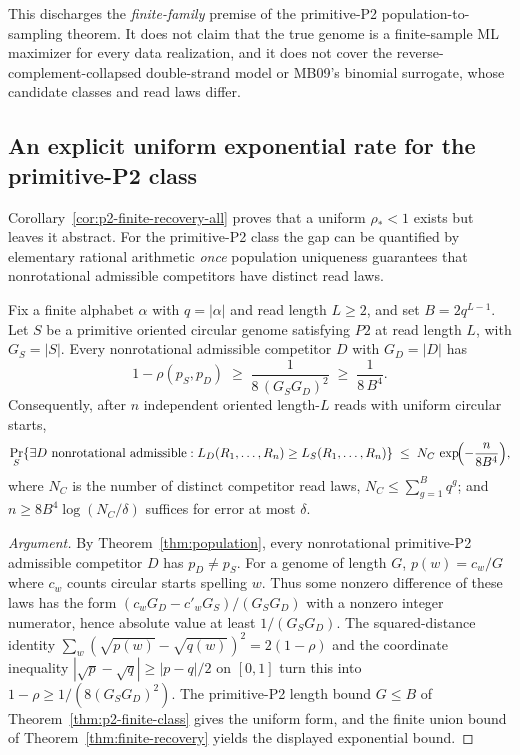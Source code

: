 This discharges the \emph{finite-family} premise of the primitive-P2
population-to-sampling theorem.  It does not claim that the true genome is a
finite-sample ML maximizer for every data realization, and it does not cover
the reverse-complement-collapsed double-strand model or MB09's binomial
surrogate, whose candidate classes and read laws differ.


\subsection{An explicit uniform exponential rate for the primitive-P2 class}
\label{sec:p2-uniform-rate}

Corollary~\ref{cor:p2-finite-recovery-all} proves that a uniform
$\rho_*<1$ exists but leaves it abstract.  For the primitive-P2 class the gap
can be quantified by elementary rational arithmetic \emph{once}
population uniqueness guarantees that nonrotational admissible
competitors have distinct read laws.

\begin{theorem}
\label{thm:p2-uniform-rate}
Fix a finite alphabet $\alpha$ with $q=|\alpha|$ and read length $L\ge2$, and
set $B=2q^{L-1}$.  Let $S$ be a primitive oriented circular genome satisfying
$P2$ at read length $L$, with $G_S=|S|$.  Every nonrotational admissible
competitor $D$ with $G_D=|D|$ has
\[
  1-\rho(p_S,p_D)\;\ge\;\frac{1}{8\,(G_S G_D)^2}\;\ge\;\frac{1}{8\,B^4}.
\]
Consequently, after $n$ independent oriented length-$L$ reads with uniform
circular starts,
\[
  \Pr_S\!\left\{\exists D\ \text{nonrotational admissible}:
       L_D(R_1,\dots,R_n)\ge L_S(R_1,\dots,R_n)\right\}
  \;\le\; N_C\,\exp\!\Bigl(-\frac{n}{8B^4}\Bigr),
\]
where $N_C$ is the number of distinct competitor read laws,
$N_C\le\sum_{g=1}^{B}q^{g}$; and
$n\ge 8B^4\log(N_C/\delta)$ suffices for error at most $\delta$.
\end{theorem}

\begin{proof}[Argument]
By Theorem~\ref{thm:population}, every nonrotational primitive-P2
admissible competitor $D$ has $p_D\ne p_S$.
For a genome of length $G$, $p(w)=c_w/G$ where $c_w$ counts circular
starts spelling $w$. Thus some nonzero difference of these laws has
the form $(c_w G_D-c'_w G_S)/(G_S G_D)$ with a nonzero integer numerator, hence
absolute value at least $1/(G_SG_D)$.  The squared-distance identity
$\sum_w(\sqrt{p(w)}-\sqrt{q(w)})^2=2(1-\rho)$ and the coordinate inequality
$|\sqrt p-\sqrt q|\ge|p-q|/2$ on $[0,1]$ turn this into
$1-\rho\ge 1/(8(G_SG_D)^2)$.  The primitive-P2 length bound $G\le B$ of
Theorem~\ref{thm:p2-finite-class} gives the uniform form, and the finite union
bound of Theorem~\ref{thm:finite-recovery} yields the displayed exponential
bound.
\end{proof}



